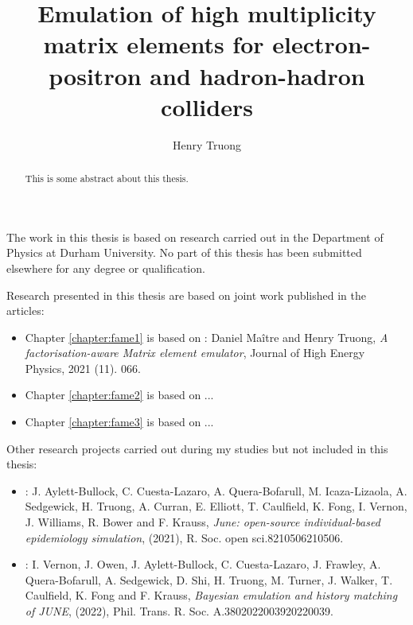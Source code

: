 \documentclass[twoside,openright,frontopenright]{ip3thesis}
\begin{document}
\title{Emulation of high multiplicity matrix elements for electron-positron and hadron-hadron colliders}
\author{Henry Truong}
\maketitlepage*

\begin{abstract}
%
	This is some abstract about this thesis.
%
\end{abstract}

\disableprotrusion
\tableofcontents*
\listoffigures
\listoftables
\enableprotrusion

\begin{declaration*}
%
	The work in this thesis is based on research carried out in the Department of
	Physics at Durham University. No part of this thesis has been
	submitted elsewhere for any degree or qualification.

	Research presented in this thesis are based on joint work
	published in the articles:
	\begin{itemize}
		\item Chapter \ref{chapter:fame1} is based on \cite{Maitre:2021uaa}: Daniel Ma\^{i}tre and Henry Truong, \textit{A factorisation-aware Matrix element emulator}, Journal of High Energy Physics, 2021 (11). 066.
		\item Chapter \ref{chapter:fame2} is based on ...
		\item Chapter \ref{chapter:fame3} is based on ...
	\end{itemize}

	Other research projects carried out during my studies but not included
	in this thesis:
	\begin{itemize}
		\item \cite{doi:10.1098/rsos.210506}: J. Aylett-Bullock, C. Cuesta-Lazaro, A. Quera-Bofarull, M. Icaza-Lizaola, A. Sedgewick, H. Truong, A. Curran, E. Elliott, T. Caulfield, K. Fong, I. Vernon, J. Williams, R. Bower and F. Krauss, \textit{June: open-source individual-based epidemiology simulation}, (2021), R. Soc. open sci.8210506210506.
		\item \cite{doi:10.1098/rsta.2022.0039}: I. Vernon, J. Owen, J. Aylett-Bullock, C. Cuesta-Lazaro, J. Frawley, A. Quera-Bofarull, A. Sedgewick, D. Shi, H. Truong, M. Turner, J. Walker, T. Caulfield, K. Fong and F. Krauss, \textit{Bayesian emulation and history matching of JUNE}, (2022), Phil. Trans. R. Soc. A.3802022003920220039.
	\end{itemize}

%
\end{declaration*}
\end{document}
